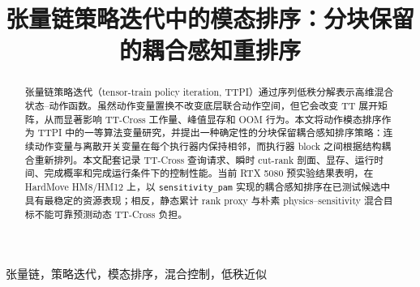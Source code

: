 \documentclass[conference]{IEEEtran}
\title{张量链策略迭代中的模态排序：分块保留的耦合感知重排序}
\author{\IEEEauthorblockN{匿名作者}
\IEEEauthorblockA{\textit{匿名单位}\\
匿名城市，匿名国家\\
anonymous@example.com}}
\begin{document}
\maketitle

\begin{abstract}
张量链策略迭代（tensor-train policy iteration, TTPI）通过序列低秩分解表示高维混合状态--动作函数。虽然动作变量置换不改变底层联合动作空间，但它会改变 TT 展开矩阵，从而显著影响 TT-Cross 工作量、峰值显存和 OOM 行为。本文将动作模态排序作为 TTPI 中的一等算法变量研究，并提出一种确定性的分块保留耦合感知排序策略：连续动作变量与离散开关变量在每个执行器内保持相邻，而执行器 block 之间根据结构耦合重新排列。本文配套记录 TT-Cross 查询请求、瞬时 cut-rank 剖面、显存、运行时间、完成概率和完成运行条件下的控制性能。当前 RTX 5080 预实验结果表明，在 HardMove HM8/HM12 上，以 \texttt{sensitivity\_pam} 实现的耦合感知排序在已测试候选中具有最稳定的资源表现；相反，静态累计 rank proxy 与朴素 physics--sensitivity 混合目标不能可靠预测动态 TT-Cross 负担。
\end{abstract}

\begin{IEEEkeywords}
张量链，策略迭代，模态排序，混合控制，低秩近似
\end{IEEEkeywords}











\end{document}
